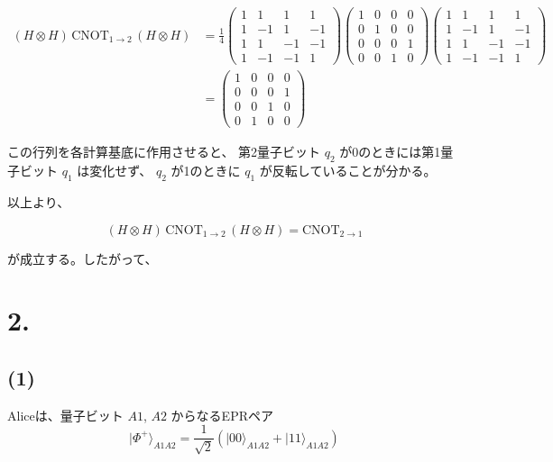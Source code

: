 \documentclass[11pt,a4paper]{ltjsarticle}
\begin{document}
\begin{align*}
(H \otimes H)\,\mathrm{CNOT}_{1 \to 2}\,(H \otimes H)
&= \frac{1}{4}
\begin{pmatrix}
1 & 1 & 1 & 1 \\
1 & -1 & 1 & -1 \\
1 & 1 & -1 & -1 \\
1 & -1 & -1 & 1
\end{pmatrix}
\begin{pmatrix}
1 & 0 & 0 & 0 \\
0 & 1 & 0 & 0 \\
0 & 0 & 0 & 1 \\
0 & 0 & 1 & 0
\end{pmatrix}
\begin{pmatrix}
1 & 1 & 1 & 1 \\
1 & -1 & 1 & -1 \\
1 & 1 & -1 & -1 \\
1 & -1 & -1 & 1
\end{pmatrix} \\
&=
\begin{pmatrix}
1 & 0 & 0 & 0 \\
0 & 0 & 0 & 1 \\
0 & 0 & 1 & 0 \\
0 & 1 & 0 & 0
\end{pmatrix}
\end{align*}

この行列を各計算基底に作用させると、
第2量子ビット $q_2$ が0のときには第1量子ビット $q_1$ は変化せず、
$q_2$ が1のときに $q_1$ が反転していることが分かる。

以上より、

\[
(H \otimes H)\,\mathrm{CNOT}_{1 \to 2}\,(H \otimes H) = \mathrm{CNOT}_{2 \to 1}
\]

が成立する。したがって、

\begin{center}
\end{center}

\section*{2.}
\subsection*{(1)}
Aliceは、量子ビット $A1$, $A2$ からなるEPRペア
\[
\lvert \Phi^+ \rangle_{A1A2}
= \frac{1}{\sqrt{2}}
\left(
\lvert 00 \rangle_{A1A2} + \lvert 11 \rangle_{A1A2}
\right)
\]
\end{document}

